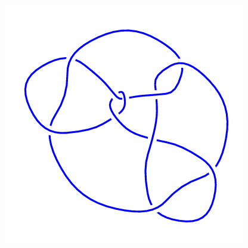 \begin{figure}[H]
\begin{minipage}[b]{.18\linewidth}
    \end{minipage}
    \begin{minipage}[b]{.18\linewidth}
        \centering
        \includegraphics[width=\linewidth]{../data/10_81.png}
    \end{minipage}
\end{figure}
